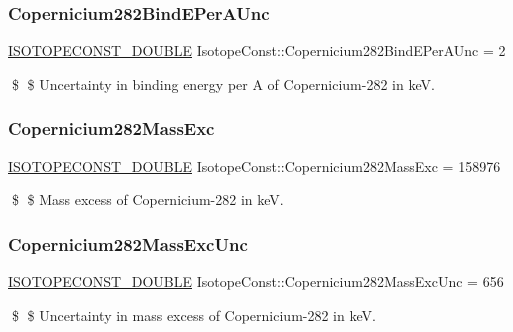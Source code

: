 \subsubsection{\texorpdfstring{Copernicium282\+Bind\+E\+Per\+A\+Unc}{Copernicium282BindEPerAUnc}}
{\footnotesize\ttfamily \mbox{\hyperlink{group___isotope_const-_macros_ga8f45a7272ce02c0b4c65c44636ed719a}{I\+S\+O\+T\+O\+P\+E\+C\+O\+N\+S\+T\+\_\+\+D\+O\+U\+B\+LE}} Isotope\+Const\+::\+Copernicium282\+Bind\+E\+Per\+A\+Unc = 2}

\$ \$ Uncertainty in binding energy per A of Copernicium-\/282 in keV. \mbox{\label{group___isotope_const-_copernicium-_cn282_ga7fd83a010c7162571297432198e2bd6f}} 
\subsubsection{\texorpdfstring{Copernicium282\+Mass\+Exc}{Copernicium282MassExc}}
{\footnotesize\ttfamily \mbox{\hyperlink{group___isotope_const-_macros_ga8f45a7272ce02c0b4c65c44636ed719a}{I\+S\+O\+T\+O\+P\+E\+C\+O\+N\+S\+T\+\_\+\+D\+O\+U\+B\+LE}} Isotope\+Const\+::\+Copernicium282\+Mass\+Exc = 158976}

\$ \$ Mass excess of Copernicium-\/282 in keV. \mbox{\label{group___isotope_const-_copernicium-_cn282_ga78180743801980b0534af744695ce74c}} 
\subsubsection{\texorpdfstring{Copernicium282\+Mass\+Exc\+Unc}{Copernicium282MassExcUnc}}
{\footnotesize\ttfamily \mbox{\hyperlink{group___isotope_const-_macros_ga8f45a7272ce02c0b4c65c44636ed719a}{I\+S\+O\+T\+O\+P\+E\+C\+O\+N\+S\+T\+\_\+\+D\+O\+U\+B\+LE}} Isotope\+Const\+::\+Copernicium282\+Mass\+Exc\+Unc = 656}

\$ \$ Uncertainty in mass excess of Copernicium-\/282 in keV. \mbox{\label{group___isotope_const-_copernicium-_cn282_ga295d1334bd7e6d8c7b25e6a3866600a7}} 
